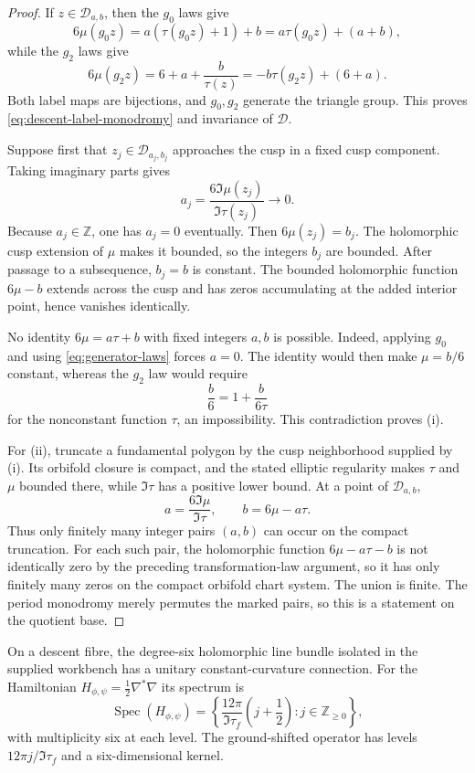 \documentclass[11pt]{article}
\numberwithin{equation}{section}
\theoremstyle{definition}
\theoremstyle{remark}
\newcommand{\Z}{\mathbb Z}
\newcommand{\Spec}{\operatorname{Spec}}
\begin{document}
\begin{proof}
If $z\in\mathcal D_{a,b}$, then the $g_0$ laws give
\[
 6\mu(g_0z)=a(\tau(g_0z)+1)+b
 =a\tau(g_0z)+(a+b),
\]
while the $g_2$ laws give
\[
 6\mu(g_2z)=6+a+\frac b{\tau(z)}
 =-b\tau(g_2z)+(6+a).
\]
Both label maps are bijections, and $g_0,g_2$ generate the triangle group.
This proves \eqref{eq:descent-label-monodromy} and invariance of $\mathcal D$.

Suppose first that $z_j\in\mathcal D_{a_j,b_j}$ approaches the cusp in a fixed cusp component.  Taking imaginary parts gives
\begin{equation}\label{eq:a-cusp}
 a_j=\frac{6\Im\mu(z_j)}{\Im\tau(z_j)}\longrightarrow0.
\end{equation}
Because $a_j\in\Z$, one has $a_j=0$ eventually.  Then
$6\mu(z_j)=b_j$.  The holomorphic cusp extension of $\mu$ makes it bounded, so the integers $b_j$ are bounded.  After passage to a subsequence, $b_j=b$ is constant.  The bounded holomorphic function $6\mu-b$ extends across the cusp and has zeros accumulating at the added interior point, hence vanishes identically.

No identity $6\mu=a\tau+b$ with fixed integers $a,b$ is possible.  Indeed, applying $g_0$ and using \eqref{eq:generator-laws} forces $a=0$.  The identity would then make $\mu=b/6$ constant, whereas the $g_2$ law would require
\[
 \frac b6=1+\frac{b}{6\tau}
\]
for the nonconstant function $\tau$, an impossibility.  This contradiction proves (i).

For (ii), truncate a fundamental polygon by the cusp neighborhood supplied by (i).  Its orbifold closure is compact, and the stated elliptic regularity makes $\tau$ and $\mu$ bounded there, while $\Im\tau$ has a positive lower bound.  At a point of $\mathcal D_{a,b}$,
\[
 a=\frac{6\Im\mu}{\Im\tau},
 \qquad b=6\mu-a\tau.
\]
Thus only finitely many integer pairs $(a,b)$ can occur on the compact truncation.  For each such pair, the holomorphic function $6\mu-a\tau-b$ is not identically zero by the preceding transformation-law argument, so it has only finitely many zeros on the compact orbifold chart system.  The union is finite.  The period monodromy merely permutes the marked pairs, so this is a statement on the quotient base.
\end{proof}

On a descent fibre, the degree-six holomorphic line bundle isolated in the supplied workbench has a unitary constant-curvature connection.  For the Hamiltonian $H_{\phi,\psi}=\tfrac12\nabla^*\nabla$ its spectrum is
\begin{equation}\label{eq:landau-spectrum}
 \Spec(H_{\phi,\psi})=
 \left\{
 \frac{12\pi}{\Im\tau_f}\left(j+\frac12\right):
 j\in\Z_{\ge0}
 \right\},
\end{equation}
with multiplicity six at each level.  The ground-shifted operator has levels
$12\pi j/\Im\tau_f$ and a six-dimensional kernel.
\end{document}
